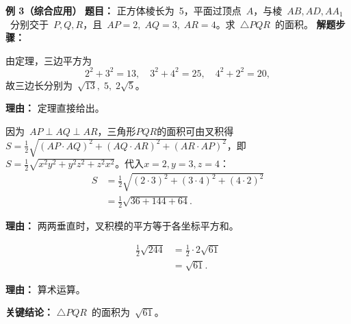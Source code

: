 \begin{examplebox}
	\medskip
	\textbf{\textcolor{CExample}{例 3（综合应用）}}
	\textbf{\textcolor{CExample}{题目：}}
	正方体棱长为~5，平面过顶点~$A$，与棱~$AB,AD,AA_1$~分别交于~$P,Q,R$，且~$AP=2,\;AQ=3,\;AR=4$。求~$\triangle PQR$~的面积。
	\textbf{\textcolor{CExample}{解题步骤：}}
	\begin{description}[style=nextline, leftmargin=2.8em, labelsep=0.5em, itemsep=0.45em]
		\item[\textbf{第一步（边长平方）：}]
			由定理，三边平方为
			\[
				2^2+3^2=13,\quad 3^2+4^2=25,\quad 4^2+2^2=20,
			\]
			故三边长分别为~$\sqrt{13},\;5,\;2\sqrt{5}$。
			\par\textbf{理由：} 定理直接给出。
		\item[\textbf{第二步（应用面积公式）：}]
			因为~$AP\perp AQ\perp AR$，三角形$PQR$的面积可由叉积得~$S=\frac12\sqrt{(AP\cdot AQ)^2+(AQ\cdot AR)^2+(AR\cdot AP)^2}$，即~$S=\frac12\sqrt{x^2y^2+y^2z^2+z^2x^2}$。代入$x=2,y=3,z=4$：
			\[
				\begin{aligned}
					S &= \frac12\sqrt{(2\cdot3)^2+(3\cdot4)^2+(4\cdot2)^2} \\ &= \frac12\sqrt{36+144+64}.
			\end{aligned}
			\]
			\par\textbf{理由：} 两两垂直时，叉积模的平方等于各坐标平方和。
		\item[\textbf{第三步（化简得结果）：}]
			\[
				\begin{aligned}
					\frac12\sqrt{244} &= \frac12\cdot2\sqrt{61} \\ &= \sqrt{61}.
			\end{aligned}
			\]
			\par\textbf{理由：} 算术运算。
	\end{description}
	\textbf{\textcolor{CExample}{关键结论：}}
	$\triangle PQR$~的面积为~$\sqrt{61}$。
\end{examplebox}
